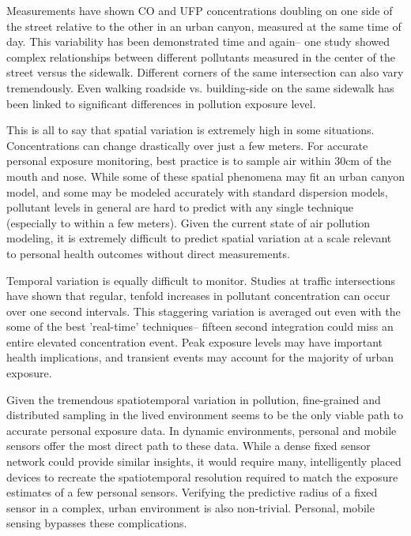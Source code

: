 Measurements have shown CO and UFP concentrations doubling on one side of the street relative to the other in an urban canyon, measured at the same time of day. \cite{xie2003} This variability has been demonstrated time and again-- one study showed complex relationships between different pollutants measured in the center of the street versus the sidewalk. \cite{raw2014} Different corners of the same intersection can also vary tremendously. \cite{kaur2007} Even walking roadside vs. building-side on the same sidewalk has been linked to significant differences in pollution exposure level. \cite{batt2014}

This is all to say that spatial variation is extremely high in some situations.  Concentrations can change drastically over just a few meters.  For accurate personal exposure monitoring, best practice is to sample air within 30cm of the mouth and nose. \cite{steinle2013, adams2009} While some of these spatial phenomena may fit an urban canyon model, and some may be modeled accurately with standard dispersion models, pollutant levels in general are hard to predict with any single technique (especially to within a few meters). \cite{hoek2008}  Given the current state of air pollution modeling, it is extremely difficult to predict spatial variation at a scale relevant to personal health outcomes without direct measurements. \cite{steinle2013, adams2009}

Temporal variation is equally difficult to monitor. \cite{lai2004, delga2012} Studies at traffic intersections have shown that regular, tenfold increases in pollutant concentration can occur over one second intervals. \cite{goel2014, wang2008} This staggering variation is averaged out even with the some of the best 'real-time' techniques-- fifteen second integration could miss an entire elevated concentration event.  Peak exposure levels may have important health implications, and transient events may account for the majority of urban exposure. \cite{lai2004, delga2012, goel2014, wang2008}

Given the tremendous spatiotemporal variation in pollution, fine-grained and distributed sampling in the lived environment seems to be the only viable path to accurate personal exposure data.  In dynamic environments, personal and mobile sensors offer the most direct path to these data.  While a dense fixed sensor network could provide similar insights, it would require many, intelligently placed devices to recreate the spatiotemporal resolution required to match the exposure estimates of a few personal sensors.  Verifying the predictive radius of a fixed sensor in a complex, urban environment is also non-trivial.  Personal, mobile sensing bypasses these complications.

